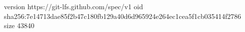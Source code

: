 version https://git-lfs.github.com/spec/v1
oid sha256:7e14713dae85f2b47c180fb129a40d6d965924e264ec1cea5f1cb035414f2786
size 43840
